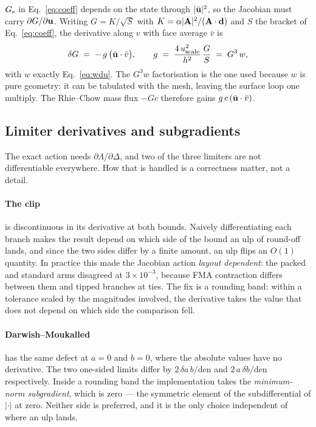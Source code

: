$G_{\mathrm{s}}$ in Eq.~\eqref{eq:coeff} depends on the state through $|\bar{\mathbf{u}}|^2$, so the Jacobian
must carry $\partial G/\partial\mathbf{u}$. Writing $G = K/\sqrt{S}$ with
$K = \alpha|\mathbf{A}|^2/(\mathbf{A}\cdot\mathbf{d})$ and $S$ the bracket of Eq.~\eqref{eq:coeff}, the
derivative along $v$ with face average $\bar{v}$ is
\begin{equation}
\delta G \;=\; -\,g\,\bigl(\bar{\mathbf{u}}\cdot\bar{v}\bigr),
\qquad
g \;=\; \frac{4\,u^2_{\text{scale}}}{h^2}\,\frac{G}{S} \;=\; G^3\,w ,
\end{equation}
with $w$ exactly Eq.~\eqref{eq:wdu}. The $G^3 w$ factorisation is the one used because $w$ is pure
geometry: it can be tabulated with the mesh, leaving the surface loop one multiply. The
Rhie--Chow mass flux $-G c$ therefore gains $g\,c\,(\bar{\mathbf{u}}\cdot\bar{v})$.

\subsection{Limiter derivatives and subgradients}
\label{sec:jac:subgrad}

The exact action needs $\partial\Lambda/\partial\Delta$, and two of the three limiters are not
differentiable everywhere. How that is handled is a correctness matter, not a detail.

\paragraph{The clip} is discontinuous in its derivative at both bounds. Naively differentiating
each branch makes the result depend on which side of the bound an ulp of round-off lands, and
since the two sides differ by a finite amount, an ulp flips an $O(1)$ quantity. In practice this
made the Jacobian action \emph{layout dependent}: the packed and standard arms disagreed at
$3\times10^{-3}$, because FMA contraction differs between them and tipped branches at ties. The
fix is a rounding band: within a tolerance scaled by the magnitudes involved, the derivative takes
the value that does not depend on which side the comparison fell.

\paragraph{Darwish--Moukalled} has the same defect at $a=0$ and $b=0$, where the absolute values
have no derivative. The two one-sided limits differ by $2\,\delta a\,b/\mathrm{den}$ and
$2\,a\,\delta b/\mathrm{den}$ respectively. Inside a rounding band the implementation takes the
\emph{minimum-norm subgradient}, which is zero --- the symmetric element of the subdifferential of
$|\cdot|$ at zero. Neither side is preferred, and it is the only choice independent of where an
ulp lands.

